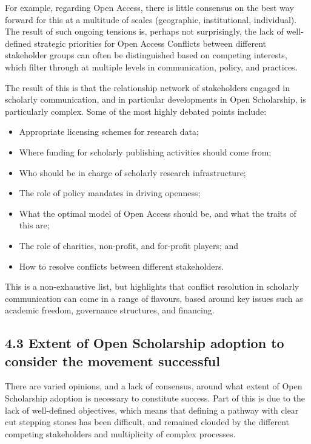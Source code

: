 For example, regarding Open Access, there is little consensus on the
best way forward for this at a multitude of scales (geographic,
institutional, individual). The result of such ongoing tensions is,
perhaps not surprisingly, the lack of well-defined strategic priorities
for Open Access Conflicts between different stakeholder groups can often
be distinguished based on competing interests, which filter through at
multiple levels in communication, policy, and practices.

The result of this is that the relationship network of stakeholders
engaged in scholarly communication, and in particular developments in
Open Scholarship, is particularly complex. Some of the most highly
debated points include:

\begin{itemize}
\tightlist
\item
  Appropriate licensing schemes for research data;
\item
  Where funding for scholarly publishing activities should come from;
\item
  Who should be in charge of scholarly research infrastructure;
\item
  The role of policy mandates in driving openness;
\item
  What the optimal model of Open Access should be, and what the traits
  of this are;
\item
  The role of charities, non-profit, and for-profit players; and
\item
  How to resolve conflicts between different stakeholders.
\end{itemize}

This is a non-exhaustive list, but highlights that conflict resolution
in scholarly communication can come in a range of flavours, based around
key issues such as academic freedom, governance structures, and
financing.

\subsection{4.3 Extent of Open Scholarship adoption to consider the
movement
successful}\label{extent-of-open-scholarship-adoption-to-consider-the-movement-successful}

There are varied opinions, and a lack of consensus, around what extent
of Open Scholarship adoption is necessary to constitute success. Part of
this is due to the lack of well-defined objectives, which means that
defining a pathway with clear cut stepping stones has been difficult,
and remained clouded by the different competing stakeholders and
multiplicity of complex processes.

